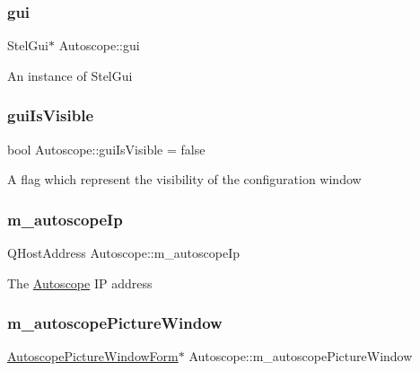 \subsubsection{\texorpdfstring{gui}{gui}}
{\footnotesize\ttfamily Stel\+Gui$\ast$ Autoscope\+::gui\hspace{0.3cm}{\ttfamily [private]}}

An instance of Stel\+Gui \mbox{\label{class_autoscope_ac995550136b93293df166aead2eda5b7}} 
\subsubsection{\texorpdfstring{guiIsVisible}{guiIsVisible}}
{\footnotesize\ttfamily bool Autoscope\+::gui\+Is\+Visible = false\hspace{0.3cm}{\ttfamily [private]}}

A flag which represent the visibility of the configuration window \mbox{\label{class_autoscope_aa3c1b8d19881d76c680b8c4ea1692c89}} 
\subsubsection{\texorpdfstring{m\_autoscopeIp}{m\_autoscopeIp}}
{\footnotesize\ttfamily Q\+Host\+Address Autoscope\+::m\+\_\+autoscope\+Ip\hspace{0.3cm}{\ttfamily [private]}}

The \mbox{\hyperlink{class_autoscope}{Autoscope}} IP address \mbox{\label{class_autoscope_a75a50ab46f25c007b9a86d3776385fc6}} 
\subsubsection{\texorpdfstring{m\_autoscopePictureWindow}{m\_autoscopePictureWindow}}
{\footnotesize\ttfamily \mbox{\hyperlink{class_autoscope_picture_window_form}{Autoscope\+Picture\+Window\+Form}}$\ast$ Autoscope\+::m\+\_\+autoscope\+Picture\+Window\hspace{0.3cm}{\ttfamily [private]}}



